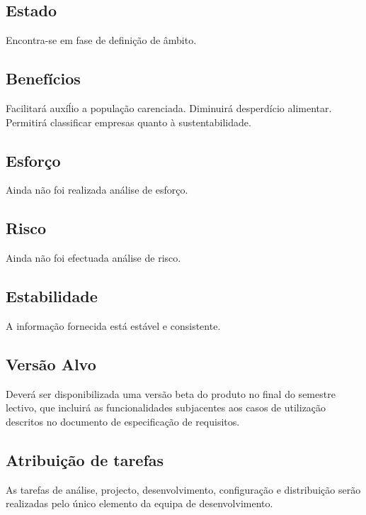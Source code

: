 \subsection{Estado}
Encontra-se em fase de definição de âmbito.
\subsection{Benefícios}
Facilitará auxíĺio a população carenciada. Diminuirá desperdício alimentar. Permitirá classificar empresas quanto à sustentabilidade.\\
\subsection{Esforço}
Ainda não foi realizada análise de esforço.
\subsection{Risco}
Ainda não foi efectuada análise de risco.
\subsection{Estabilidade}
A informação fornecida está estável e consistente.
\subsection{Versão Alvo}
Deverá ser disponibilizada uma versão beta do produto no final do semestre lectivo, que incluirá as funcionalidades subjacentes aos casos de utilização descritos no documento de especificação de requisitos.
\subsection{Atribuição de tarefas}
As tarefas de análise, projecto, desenvolvimento, configuração e distribuição serão realizadas pelo único elemento da equipa de desenvolvimento.
\clearpage